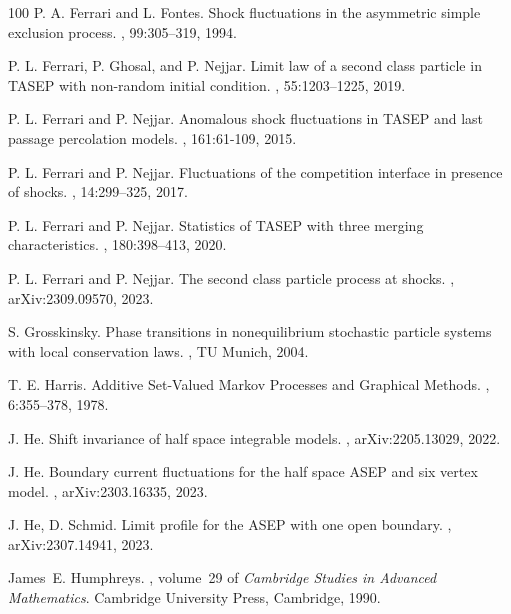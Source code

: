 \documentclass[12pt,a4paper]{amsart}
\theoremstyle{remark}
\numberwithin{equation}{section} \numberwithin{theorem}{section}
\begin{document}
\begin{thebibliography}{100}
P. A. Ferrari and L. Fontes.
\newblock   Shock fluctuations in the asymmetric simple exclusion process.
, 99:305–319, 1994.

P. L. Ferrari, P. Ghosal, and P. Nejjar.
\newblock  Limit law of a second class particle in TASEP with non-random initial condition.
,  55:1203–1225, 2019.

P. L. Ferrari and P. Nejjar.
\newblock  Anomalous shock fluctuations in TASEP and last passage percolation models.
,  161:61-109, 2015.

P. L. Ferrari and P. Nejjar.
\newblock  Fluctuations of the competition interface in presence of shocks.
,  14:299–325, 2017.

P. L. Ferrari and P. Nejjar.
\newblock  Statistics of TASEP with three merging characteristics. 
,  180:398–413, 2020.

P. L. Ferrari and P. Nejjar.
\newblock  The second class particle process at shocks.
,  arXiv:2309.09570, 2023.

S. Grosskinsky.
\newblock Phase transitions in nonequilibrium stochastic particle systems with local conservation laws.
, TU Munich, 2004.

T. E. Harris.
\newblock Additive Set-Valued Markov Processes and Graphical Methods.
, 6:355–378, 1978.

J. He.
\newblock Shift invariance of half space integrable models.
, arXiv:2205.13029, 2022.

J. He.
\newblock Boundary current fluctuations for the half space ASEP and six vertex model.
, arXiv:2303.16335, 2023.

J. He, D. Schmid.
\newblock Limit profile for the ASEP with one open boundary.
, arXiv:2307.14941, 2023.

James~E. Humphreys.
, volume~29 of {\em Cambridge Studies in Advanced Mathematics}.
\newblock Cambridge University Press, Cambridge, 1990.


\end{thebibliography}
\end{document}
